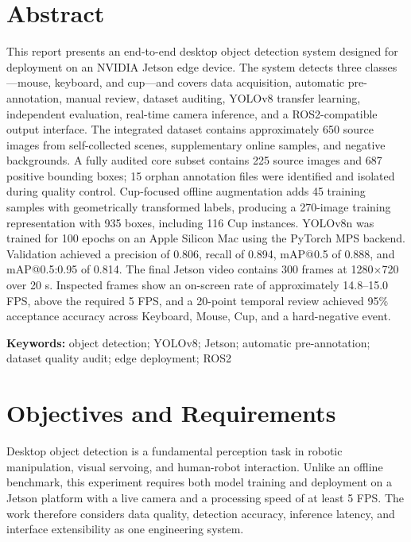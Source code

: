 \documentclass[a4paper,11pt]{article}
\begin{document}
\setcounter{page}{1}
\section*{Abstract}
This report presents an end-to-end desktop object detection system designed for deployment on an NVIDIA Jetson edge device. The system detects three classes---mouse, keyboard, and cup---and covers data acquisition, automatic pre-annotation, manual review, dataset auditing, YOLOv8 transfer learning, independent evaluation, real-time camera inference, and a ROS2-compatible output interface. The integrated dataset contains approximately 650 source images from self-collected scenes, supplementary online samples, and negative backgrounds. A fully audited core subset contains 225 source images and 687 positive bounding boxes; 15 orphan annotation files were identified and isolated during quality control. Cup-focused offline augmentation adds 45 training samples with geometrically transformed labels, producing a 270-image training representation with 935 boxes, including 116 Cup instances. YOLOv8n was trained for 100 epochs on an Apple Silicon Mac using the PyTorch MPS backend. Validation achieved a precision of 0.806, recall of 0.894, mAP@0.5 of 0.888, and mAP@0.5:0.95 of 0.814. The final Jetson video contains 300 frames at 1280$\times$720 over 20 s. Inspected frames show an on-screen rate of approximately 14.8--15.0 FPS, above the required 5 FPS, and a 20-point temporal review achieved 95\% acceptance accuracy across Keyboard, Mouse, Cup, and a hard-negative event.

\vspace{0.8em}\noindent\textbf{Keywords:} object detection; YOLOv8; Jetson; automatic pre-annotation; dataset quality audit; edge deployment; ROS2
\clearpage\tableofcontents\clearpage
{}\setcounter{page}{1}

\section{Objectives and Requirements}
Desktop object detection is a fundamental perception task in robotic manipulation, visual servoing, and human-robot interaction. Unlike an offline benchmark, this experiment requires both model training and deployment on a Jetson platform with a live camera and a processing speed of at least 5 FPS. The work therefore considers data quality, detection accuracy, inference latency, and interface extensibility as one engineering system.
\end{document}
